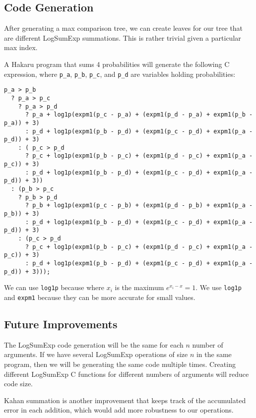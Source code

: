 \documentclass[12pt]{article}
\begin{document}
\subsection*{Code Generation}

After generating a max comparison tree, we can create leaves for our tree that
are different LogSumExp summations. This is rather trivial given a particular
max index.


A Hakaru program that sums 4 probabilities will generate the following C
expression, where {\tt p\_a}, {\tt p\_b}, {\tt p\_c}, and {\tt p\_d} are
variables holding probabilities:

{\small
\begin{verbatim}
p_a > p_b
  ? p_a > p_c
    ? p_a > p_d
      ? p_a + log1p(expm1(p_c - p_a) + (expm1(p_d - p_a) + expm1(p_b - p_a)) + 3)
      : p_d + log1p(expm1(p_b - p_d) + (expm1(p_c - p_d) + expm1(p_a - p_d)) + 3)
    : ( p_c > p_d
      ? p_c + log1p(expm1(p_b - p_c) + (expm1(p_d - p_c) + expm1(p_a - p_c)) + 3)
      : p_d + log1p(expm1(p_b - p_d) + (expm1(p_c - p_d) + expm1(p_a - p_d)) + 3))
  : (p_b > p_c
    ? p_b > p_d
      ? p_b + log1p(expm1(p_c - p_b) + (expm1(p_d - p_b) + expm1(p_a - p_b)) + 3)
      : p_d + log1p(expm1(p_b - p_d) + (expm1(p_c - p_d) + expm1(p_a - p_d)) + 3)
    : (p_c > p_d
      ? p_c + log1p(expm1(p_b - p_c) + (expm1(p_d - p_c) + expm1(p_a - p_c)) + 3)
      : p_d + log1p(expm1(p_b - p_d) + (expm1(p_c - p_d) + expm1(p_a - p_d)) + 3)));
\end{verbatim}
}

We can use {\tt log1p} because where $x_i$ is the maximum
$e^{x_i - \hat x} = 1$. We use {\tt log1p} and {\tt expm1} because they can be
more accurate for small values.

\subsection*{Future Improvements}

The LogSumExp code generation will be the same for each $n$ number of
arguments. If we have several LogSumExp operations of size $n$ in the same
program, then we will be generating the same code multiple times. Creating
different LogSumExp C functions for different numbers of arguments will reduce
code size.

Kahan summation is another improvement that keeps track of the accumulated
error in each addition, which would add more robustness to our operations.

% 
% 
\end{document}

